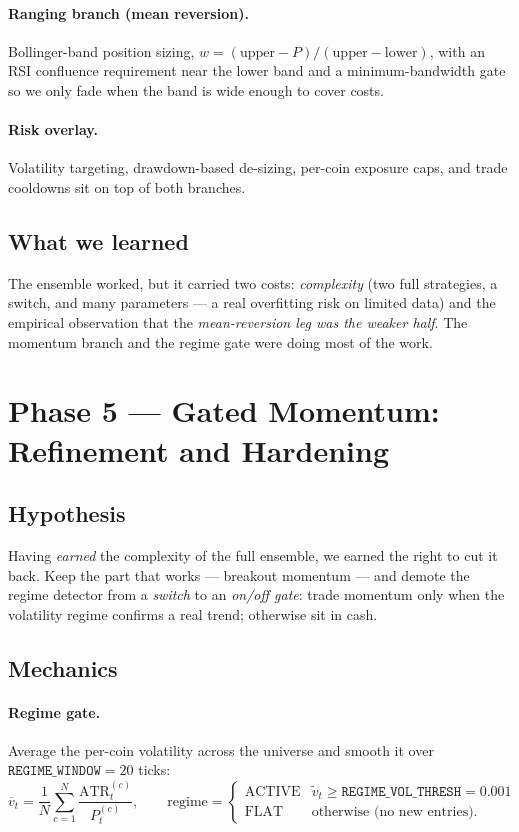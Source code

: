 \documentclass[11pt,a4paper]{article}
\newcommand{\param}[1]{\texttt{#1}}
\begin{document}
\paragraph{Ranging branch (mean reversion).} Bollinger-band position sizing,
$w = (\text{upper}-P)/(\text{upper}-\text{lower})$, with an RSI confluence
requirement near the lower band and a minimum-bandwidth gate so we only fade when
the band is wide enough to cover costs.
\paragraph{Risk overlay.} Volatility targeting, drawdown-based de-sizing, per-coin
exposure caps, and trade cooldowns sit on top of both branches.

\subsection{What we learned}
The ensemble worked, but it carried two costs: \emph{complexity} (two full
strategies, a switch, and many parameters --- a real overfitting risk on limited
data) and the empirical observation that the \emph{mean-reversion leg was the
weaker half}. The momentum branch and the regime gate were doing most of the work.

\section{Phase 5 --- Gated Momentum: Refinement and Hardening}

\subsection{Hypothesis}
Having \emph{earned} the complexity of the full ensemble, we earned the right to
cut it back. Keep the part that works --- breakout momentum --- and demote the
regime detector from a \emph{switch} to an \emph{on/off gate}: trade momentum only
when the volatility regime confirms a real trend; otherwise sit in cash.

\subsection{Mechanics}
\paragraph{Regime gate.} Average the per-coin volatility across the universe and
smooth it over $\param{REGIME\_WINDOW}=20$ ticks:
\begin{equation}
  \overline{v}_t = \frac{1}{N}\sum_{c=1}^{N}\frac{\mathrm{ATR}^{(c)}_t}{P^{(c)}_t},\qquad
  \text{regime} =
  \begin{cases}
    \text{ACTIVE} & \widetilde{v}_t \ge \param{REGIME\_VOL\_THRESH}=0.001\\
    \text{FLAT}   & \text{otherwise (no new entries).}
  \end{cases}
\end{equation}
\end{document}
